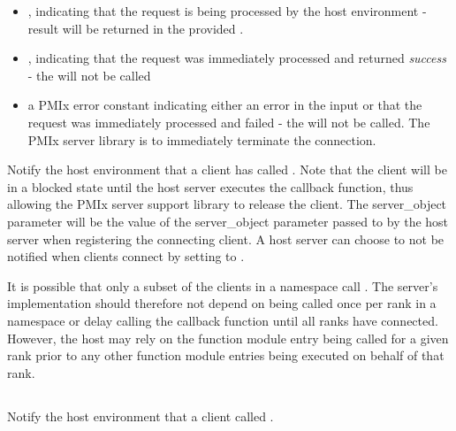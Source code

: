 \begin{itemize}
    \item {}, indicating that the request is being processed by the host environment - result will be returned in the provided .
    \item {}, indicating that the request was immediately processed and returned \textit{success} - the  will not be called
    \item a PMIx error constant indicating either an error in the input or that the request was immediately processed and failed - the  will not be called. The \ac{PMIx} server library is to immediately terminate the connection.
\end{itemize}

\descr

Notify the host environment that a client has called .
Note that the client will be in a blocked state until the host server executes the callback function, thus allowing the \ac{PMIx} server support library to release
the client.
The server_object parameter will be the value of the server_object parameter passed to
 by the host server when registering the connecting client. A host server can choose to not be notified when clients connect by setting  to .

It is possible that only a subset of the clients in a namespace call
.   The server's 
implementation should therefore not depend on being called once per rank in a
namespace or delay calling the callback function until all ranks have
connected. However, the host may rely on the
function module entry being called for a given rank prior to any other function
module entries being executed on behalf of that rank.

\subsection{}

\summary

Notify the host environment that a client called .

\format

